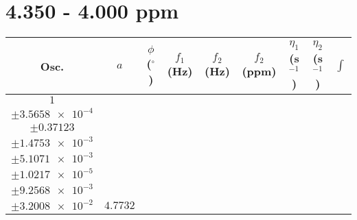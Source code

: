 \documentclass[8pt]{article}
\begin{document}
\section*{4.350 - 4.000 ppm}
\begin{longtable}[l]{c c c c c c c c c}
\toprule
Osc. & $a$ & $\phi$ ($^{\circ}$) & $f_1$ (Hz) & $f_2$ (Hz) & $f_2$ (ppm) & $\eta_1$ (s$^{-1}$) & $\eta_2$ (s$^{-1}$) & $\int$\\
\midrule
$\num{1}$ & \begin{tabular}[c]{@{}c@{}}$\num{5.493e-2}$ \\ $\pm\num{3.5658e-4}$\end{tabular} & \begin{tabular}[c]{@{}c@{}}$\num{-0.53219}$ \\ $\pm\num{0.37123}$\end{tabular} & \begin{tabular}[c]{@{}c@{}}$\num{-9.9663}$ \\ $\pm\num{1.4753e-3}$\end{tabular} & \begin{tabular}[c]{@{}c@{}}$\num{2.0213e+3}$ \\ $\pm\num{5.1071e-3}$\end{tabular} & \begin{tabular}[c]{@{}c@{}}$\num{4.0437}$ \\ $\pm\num{1.0217e-5}$\end{tabular} & \begin{tabular}[c]{@{}c@{}}$\num{1.1779}$ \\ $\pm\num{9.2568e-3}$\end{tabular} & \begin{tabular}[c]{@{}c@{}}$\num{4.2646}$ \\ $\pm\num{3.2008e-2}$\end{tabular} & $\num{4.7732}$\\

\end{longtable}
\end{document}
